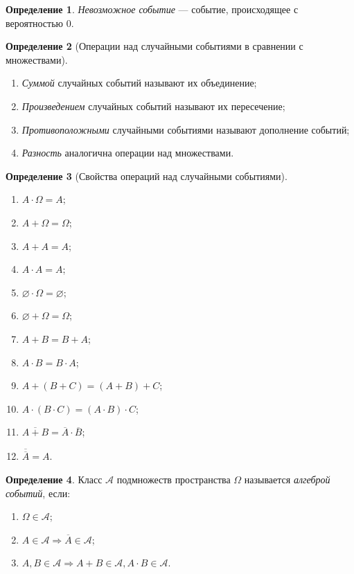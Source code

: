 \documentclass[a4paper,12pt]{article}
\let\emptyset\varnothing
\theoremstyle{remark}
\theoremstyle{definition}
\newtheorem{definition}{Определение}
\begin{document}
\begin{definition}
\emph{Невозможное событие} --- событие, происходящее с вероятностью \(0\). 
\end{definition}

\begin{definition}[Операции над случайными событиями в сравнении с множествами]
\(\)
\begin{enumerate}
	\item \emph{Суммой} случайных событий называют их объединение;
	\item \emph{Произведением} случайных событий называют их пересечение;
	\item \emph{Противоположными} случайными событиями называют дополнение событий;
	\item \emph{Разность} аналогична операции над множествами.
\end{enumerate}
\end{definition}

\begin{definition}[Свойства операций над случайными событиями]
\(\)
\begin{multicols}{2}
\begin{enumerate}
	\item \(A \cdot \Omega = A\);
	\item \(A + \Omega = \Omega\);
	\item \(A + A = A\);
	\item \(A \cdot A = A\);
	\item \(\emptyset \cdot \Omega = \emptyset\);
	\item \(\emptyset + \Omega = \Omega\);
	\item \(A + B = B + A\);
	\item \(A \cdot B = B \cdot A\);
	\item \(A + (B + C) = (A + B) + C\); 
	\item \(A \cdot (B \cdot C) = (A \cdot B) \cdot C\);
	\item \(\overline{A + B} = \overline{A} \cdot \overline{B}\);
	\item \(\overline{\overline{A}} = A\).
\end{enumerate}
\end{multicols}
\end{definition}

\begin{definition}
Класс \(\mathcal{A}\) подмножеств пространства \(\Omega\) называется \emph{алгеброй событий}, если:
\begin{enumerate}
	\item \(\Omega \in \mathcal{A}\);
	\item \(A \in \mathcal{A} \Rightarrow \overline{A} \in \mathcal{A}\);
	\item \(A, B \in \mathcal{A} \Rightarrow A + B \in \mathcal{A}, A \cdot B \in \mathcal{A}\).
\end{enumerate}
\end{definition}
\end{document}
